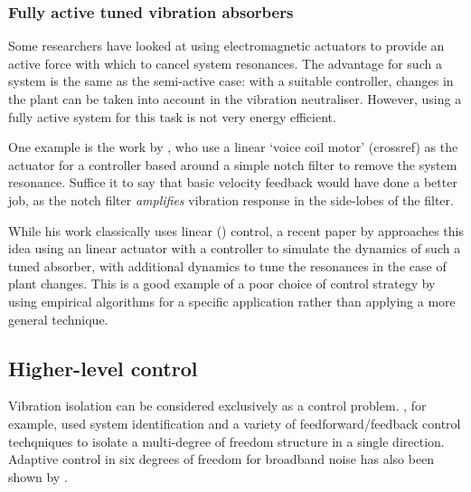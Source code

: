 \subsubsection{Fully active tuned vibration absorbers}

Some researchers have looked at using electromagnetic actuators to
provide an active force with which to cancel system resonances. The
advantage for such a system is the same as the semi-active case: with
a suitable controller, changes in the plant can be taken into account
in the vibration neutraliser. However, using a fully active system for
this task is not very energy efficient.

One example is the work by \textcite{chen2005a}, who use a linear
`voice coil motor' (crossref) as the actuator for a controller based
around a simple notch filter to remove the system resonance. Suffice
it to say that basic velocity feedback would have done a better job,
as the notch filter \emph{amplifies} vibration response in the
side-lobes of the filter.

While his work classically uses linear (\PID) control, a recent paper
by \textcite{wu2007} approaches this idea using an linear actuator
with a controller to simulate the dynamics of such a tuned absorber,
with additional dynamics to tune the resonances in the case of plant
changes. This is a good example of a poor choice of control strategy
by using empirical algorithms for a specific application rather than
applying a more general technique. 



\subsection{Higher-level control}

Vibration isolation can be considered exclusively as a control
problem. \textcite{guo2005}, for example, used system identification
and a variety of feedforward/feedback control techqniques to isolate a
multi-degree of freedom structure in a single direction. Adaptive
control in six degrees of freedom for broadband noise has also been
shown by \textcite{duindam2005}.

